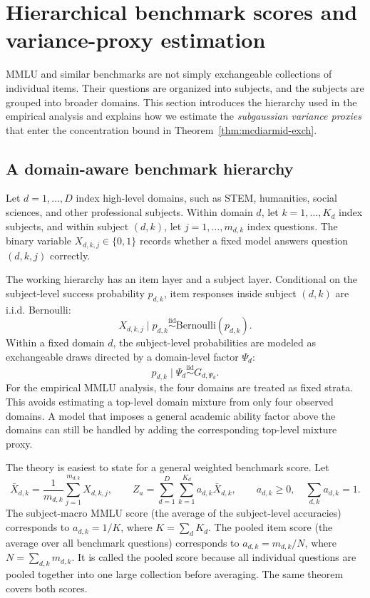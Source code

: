 \documentclass[11pt]{article}
\theoremstyle{definition}
\theoremstyle{remark}
\begin{document}
\newpage





\section{Hierarchical benchmark scores and variance-proxy estimation}\label{sec:hierarchical}

MMLU and similar benchmarks are not simply exchangeable collections of individual items.  Their questions are organized into subjects, and the subjects are grouped into broader domains. This section introduces the hierarchy used in the empirical analysis and explains how we estimate the \emph{subgaussian variance proxies} that enter the concentration bound in Theorem~\ref{thm:mcdiarmid-exch}.

\subsection{A domain-aware benchmark hierarchy}

Let \(d=1,\ldots,D\) index high-level domains, such as STEM, humanities, social sciences, and other professional subjects. Within domain \(d\), let \(k=1,\ldots,K_d\) index subjects, and within subject \((d,k)\), let \(j=1,\ldots,m_{d,k}\) index questions. The binary variable \(X_{d,k,j}\in\{0,1\}\) records whether a fixed model answers question \((d,k,j)\) correctly.

The working hierarchy has an item layer and a subject layer.  Conditional on the subject-level success probability \(p_{d,k}\), item responses inside subject \((d,k)\) are i.i.d. Bernoulli:
\[
    X_{d,k,j}\mid p_{d,k}
    \stackrel{\mathrm{iid}}{\sim}\mathrm{Bernoulli}(p_{d,k}).
\]
Within a fixed domain \(d\), the subject-level probabilities are modeled as exchangeable draws directed by a domain-level factor \(\Psi_d\):
\[
    p_{d,k}\mid \Psi_d
    \stackrel{\mathrm{iid}}{\sim}G_{d,\Psi_d}.
\]
For the empirical MMLU analysis, the four domains are treated as fixed strata. This avoids estimating a top-level domain mixture from only four observed domains. A model that imposes a general academic ability factor above the domains can still be handled by adding the corresponding top-level mixture proxy.

The theory is easiest to state for a general weighted benchmark score.  Let
\[
    \bar X_{d,k}=\frac1{m_{d,k}}\sum_{j=1}^{m_{d,k}}X_{d,k,j},
    \qquad
    Z_a=\sum_{d=1}^D\sum_{k=1}^{K_d} a_{d,k}\bar X_{d,k},
    \qquad
    a_{d,k}\ge0,
    \quad
    \sum_{d,k}a_{d,k}=1.
\]
The subject-macro MMLU score (the average of the subject-level accuracies) corresponds to \(a_{d,k}=1/K\), where \(K=\sum_dK_d\). The pooled item score (the average over all benchmark questions) corresponds to \(a_{d,k}=m_{d,k}/N\), where \(N=\sum_{d,k}m_{d,k}\). It is called the pooled score because all individual questions are pooled together into one large collection before averaging. The same theorem covers both scores.
\end{document}
